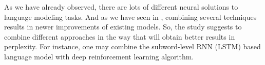 \documentclass{IEEEtran}
\begin{document}
As we have already observed, there are lots of different neural solutions to language modeling tasks. And as we have seen in \cite{Quoc2017Reinforcement}, combining several techniques results in newer improvements of existing models. So, the study suggests to combine different approaches in the way that will obtain better results in perplexity. For instance, one may combine the subword-level RNN (LSTM) based language model with deep reinforcement learning algorithm.



\printbibliography
\end{document}
